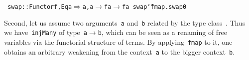 \documentclass[9pt,authoryear]{sigplanconf}
\begin{document}
{{}\vphantom{$\{$}}\texttt{{\nopagebreak \newline%
}\vphantom{$\{$}}\texttt{swap}\texttt{\mbox{\hspace{0.50em}}}\texttt{{:}{:}}\texttt{\mbox{\hspace{0.50em}}}\texttt{\makebox[1.22ex][l]{$ {(} $}}\texttt{Functor}\texttt{\mbox{\hspace{0.50em}}}\texttt{f,}\texttt{\mbox{\hspace{0.50em}}}\texttt{Eq}\texttt{\mbox{\hspace{0.50em}}}\texttt{a}\texttt{\makebox[1.22ex][r]{$ {)} $}}\texttt{\mbox{\hspace{0.50em}}}\texttt{$ \Rightarrow $}\texttt{\mbox{\hspace{0.50em}}}\texttt{\makebox[1.22ex][l]{$ {(} $}}\texttt{a,}\texttt{\mbox{\hspace{0.50em}}}\texttt{a}\texttt{\makebox[1.22ex][r]{$ {)} $}}\texttt{\mbox{\hspace{0.50em}}}\texttt{$ \rightarrow $}\texttt{\mbox{\hspace{0.50em}}}\texttt{f}\texttt{\mbox{\hspace{0.50em}}}\texttt{a}\texttt{\mbox{\hspace{0.50em}}}\texttt{$ \rightarrow $}\texttt{\mbox{\hspace{0.50em}}}\texttt{f}\texttt{\mbox{\hspace{0.50em}}}\texttt{a}\texttt{{\nopagebreak \newline%
}\vphantom{$\{$}}\texttt{swap}\texttt{\mbox{\hspace{0.50em}}}\texttt{{\char `\=}}\texttt{\mbox{\hspace{0.50em}}}\texttt{fmap}\texttt{\mbox{\hspace{0.50em}}}\texttt{.}\texttt{\mbox{\hspace{0.50em}}}\texttt{swap0}\texttt{{\nopagebreak \newline%
}\vphantom{$\{$}}%


%
Second, let us assume two arguments{~}\texttt{a} and{~}\texttt{b} related by the
    type class{~}\texttt{\makebox[1.83ex][c]{$ \subseteq $}}. Thus we have{~}\texttt{injMany} of type{~}\texttt{a}\texttt{\mbox{\hspace{0.50em}}}\texttt{$ \rightarrow $}\texttt{\mbox{\hspace{0.50em}}}\texttt{b}, which
    can be seen as a renaming of free variables via the functorial
    structure of terms. By applying{~}\texttt{fmap} to it, one obtains
    an arbitrary weakening from the context{~}\texttt{a} to the bigger
    context{~}\texttt{b}.%
\end{document}
